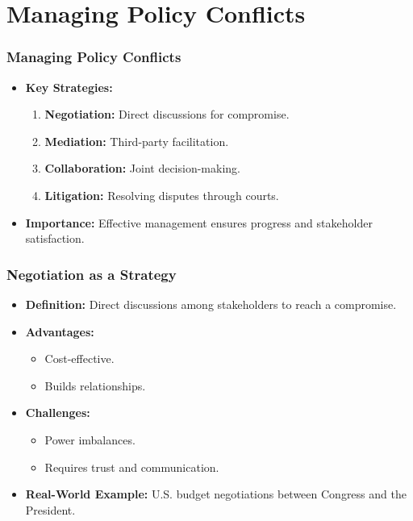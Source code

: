 \documentclass[10pt]{beamer}
\begin{document}
    \section{Managing Policy Conflicts}

    \begin{frame}
    \frametitle{Managing Policy Conflicts}
    \begin{itemize}
        \item \textbf{Key Strategies:}
            \begin{enumerate}
                \item \textbf{Negotiation:} Direct discussions for compromise.
                \item \textbf{Mediation:} Third-party facilitation.
                \item \textbf{Collaboration:} Joint decision-making.
                \item \textbf{Litigation:} Resolving disputes through courts.
            \end{enumerate}
        \item \textbf{Importance:} Effective management ensures progress and stakeholder satisfaction.
    \end{itemize}
    \end{frame}
    
    \begin{frame}
    \frametitle{Negotiation as a Strategy}
    \begin{itemize}
        \item \textbf{Definition:} Direct discussions among stakeholders to reach a compromise.
        \item \textbf{Advantages:}
            \begin{itemize}
                \item Cost-effective.
                \item Builds relationships.
            \end{itemize}
        \item \textbf{Challenges:}
            \begin{itemize}
                \item Power imbalances.
                \item Requires trust and communication.
            \end{itemize}
        \item \textbf{Real-World Example:} U.S. budget negotiations between Congress and the President.
    \end{itemize}
    \end{frame}
\end{document}
